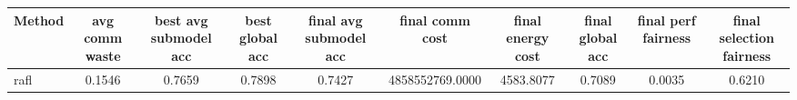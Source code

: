 \begin{tabular}{lccccccccc}
\toprule
Method & avg comm waste & best avg submodel acc & best global acc & final avg submodel acc & final comm cost & final energy cost & final global acc & final perf fairness & final selection fairness \\
\midrule
rafl & 0.1546 & 0.7659 & 0.7898 & 0.7427 & 4858552769.0000 & 4583.8077 & 0.7089 & 0.0035 & 0.6210 \\
\bottomrule
\end{tabular}
